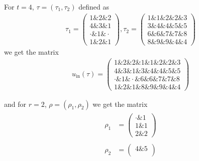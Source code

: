 \begin{example}
\noindent \begin{minipage}[t]{.5\textwidth}
For $t = 4$, $\tau = (\tau_{1}, \tau_{2})$ defined as
\begin{align*}
\tau_{1} = \begin{pmatrix}
1 \ampersand 2 \ampersand 2 \\
4 \ampersand 3 \ampersand 1 \\
\cdot \ampersand 1 \ampersand \cdot \\
1 \ampersand 2 \ampersand 1
\end{pmatrix},
\tau_{2} = \begin{pmatrix}
1 \ampersand 1 \ampersand 2 \ampersand 2 \ampersand 3 \\
3 \ampersand 4 \ampersand 4 \ampersand 5 \ampersand 5 \\
6 \ampersand 6 \ampersand 7 \ampersand 7 \ampersand 8 \\
8 \ampersand 9 \ampersand 9 \ampersand 4 \ampersand 4
\end{pmatrix}
\end{align*}
we get the matrix
\begin{align*}
u_{\text{in}}(\tau) = \begin{pmatrix}
1 \ampersand 2 \ampersand 2 \ampersand 1 \ampersand 1 \ampersand 2 \ampersand 2 \ampersand 3 \\
4 \ampersand 3 \ampersand 1 \ampersand 3 \ampersand 4 \ampersand 4 \ampersand 5 \ampersand 5 \\
\cdot \ampersand 1 \ampersand \cdot \ampersand 6 \ampersand 6 \ampersand 7 \ampersand 7 \ampersand 8 \\
1 \ampersand 2 \ampersand 1 \ampersand 8 \ampersand 9 \ampersand 9 \ampersand 4 \ampersand 4
\end{pmatrix}
\end{align*}
\end{minipage}
\begin{minipage}[t]{.5\textwidth}
and for $r = 2$, $\rho = (\rho_{1}, \rho_{2})$ we get the matrix
\begin{align*}
\begin{array}{rr}
\rho_{1} &= \begin{pmatrix}
\cdot \ampersand 1 \\
1 \ampersand 1 \\
2 \ampersand 2
\end{pmatrix} \\
\\
\rho_{2} &= \begin{pmatrix}
4 \ampersand 5 \\

\end{pmatrix}
\end{array}
\end{align*}
\end{minipage}
\end{example}

